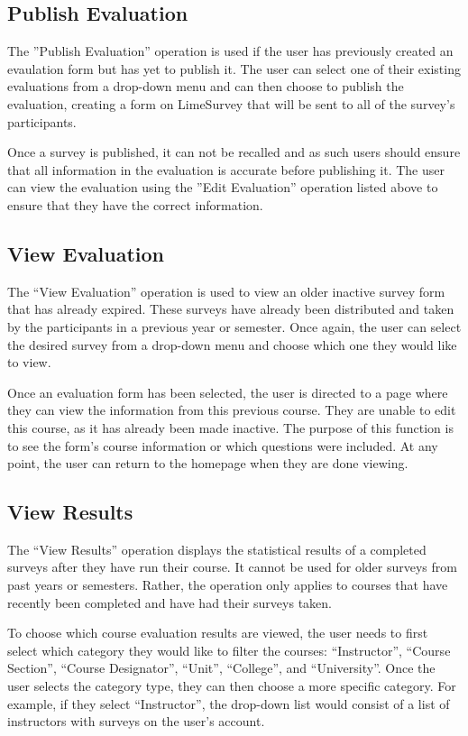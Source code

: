 \documentclass{article}
\begin{document}
\subsection{Publish Evaluation}

The ''Publish Evaluation'' operation is used if the user has previously created an evaulation form but has yet to publish it. The user can select one of their existing evaluations from a drop-down menu and can then choose to publish the evaluation, creating a form on LimeSurvey that will be sent to all of the survey's participants.

Once a survey is published, it can not be recalled and as such users should ensure that all information in the evaluation is accurate before publishing it.  The user can view the evaluation using the ''Edit Evaluation'' operation listed above to ensure that they have the correct information.

\subsection{View Evaluation}

The ``View Evaluation'' operation is used to view an older inactive survey form that has already expired. These surveys have already been distributed and taken by the participants in a previous year or semester. Once again, the user can select the desired survey from a drop-down menu and choose which one they would like to view.

Once an evaluation form has been selected, the user is directed to a page where they can view the information from this previous course. They are unable to edit this course, as it has already been made inactive. The purpose of this function is to see the form's course information or which questions were included. At any point, the user can return to the homepage when they are done viewing.

\subsection{View Results}

The ``View Results'' operation displays the statistical results of a completed surveys after they have run their course. It cannot be used for older surveys from past years or semesters. Rather, the operation only applies to courses that have recently been completed and have had their surveys taken.

To choose which course evaluation results are viewed, the user needs to first select which category they would like to filter the courses: ``Instructor'', ``Course Section'', ``Course Designator'', ``Unit'', ``College'', and ``University''. Once the user selects the category type, they can then choose a more specific category. For example, if they select ``Instructor'', the drop-down list would consist of a list of instructors with surveys on the user's account. 
\end{document}
